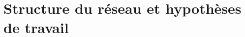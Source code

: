 \chapter{Structure du réseau et hypothèses de travail}\label{chap:st}

\renewcommand\chapterpath{Main/Structure}
\renewcommand\chapterfig{Main/Structure/Figures}




